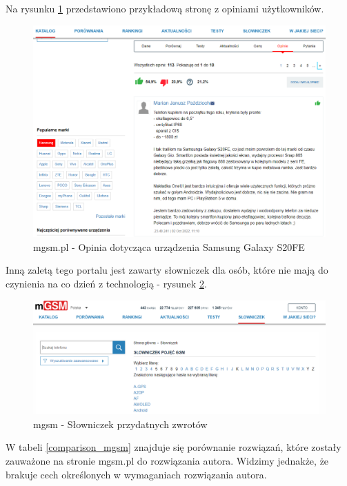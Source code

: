 Na rysunku \ref*{mgsm_4} przedstawiono przykładową stronę z opiniami użytkowników.
\begin{figure}[H]
    \centering
    \includegraphics[scale=0.45]{img/mgsm/mgsmComments.png}
    \caption{mgsm.pl - Opinia dotycząca urządzenia Samsung Galaxy S20FE}
    \label{mgsm_4}
\end{figure}
Inną zaletą tego portalu jest zawarty słowniczek dla osób, które nie mają do czynienia na co dzień z technologią - rysunek \ref{mgsm_5}. 
\begin{figure}[H]
    \centering
    \includegraphics[scale=0.47]{img/mgsm/dictonary.png}
    \caption{mgsm - Słowniczek przydatnych zwrotów}
    \label{mgsm_5}
\end{figure}
W tabeli \ref*{comparison_mgsm} znajduje się porównanie rozwiązań, które zostały zauważone na stronie mgsm.pl do rozwiązania autora. Widzimy jednakże, że brakuje cech określonych w wymaganiach rozwiązania autora.
